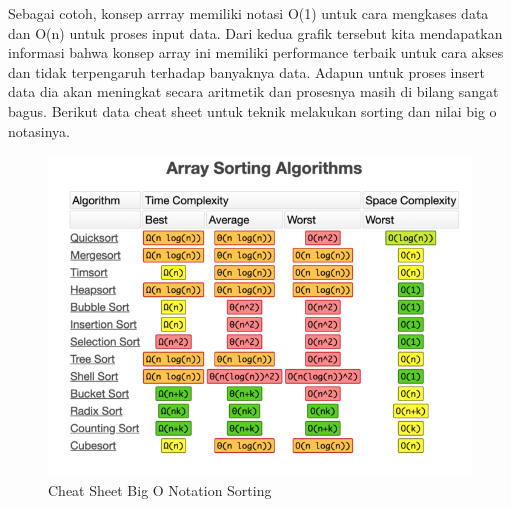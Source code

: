 Sebagai cotoh, konsep arrray memiliki notasi O(1) untuk cara mengkases data dan O(n) untuk proses input data. Dari kedua grafik tersebut kita mendapatkan informasi bahwa konsep array ini memiliki performance terbaik untuk cara akses dan tidak terpengaruh terhadap banyaknya data. Adapun untuk proses insert data dia akan meningkat secara aritmetik dan prosesnya masih di bilang sangat bagus. Berikut data cheat sheet untuk teknik melakukan sorting dan nilai big o notasinya.
\begin{figure}[H]
        \centerline{\includegraphics[scale=0.5]{figures/algoritma-kompleksitas/cheatsheetbigonotationsorting}}
        \caption{Cheat Sheet Big O Notation Sorting}
\end{figure}

